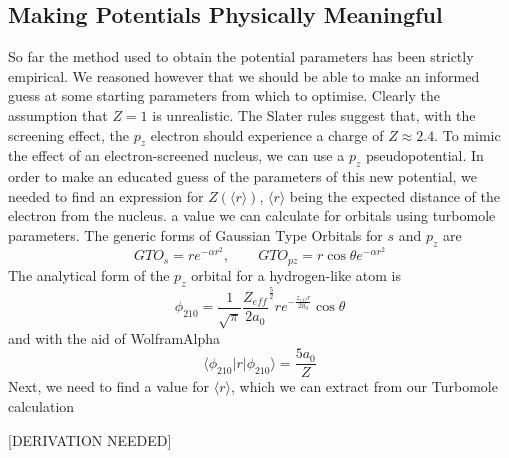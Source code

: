 \documentclass[journal=jctcce,manuscript=article]{achemso}
\begin{document}
\subsection{Making Potentials Physically Meaningful}

So far the method used to obtain the potential parameters has been strictly empirical. We reasoned however that we should be able to make an informed guess at some starting parameters from which to optimise. Clearly the assumption that \(Z = 1\) is unrealistic. The Slater rules suggest that, with the screening effect, the \(p_{z}\) electron should experience a charge of \(Z \approx 2.4\). To mimic the effect of an electron-screened nucleus, we can use a \(p_{z}\) pseudopotential. In order to make an educated guess of the parameters of this new potential, we needed to find an expression for \(Z(\langle r \rangle)\), \( \langle r \rangle \) being the expected distance of the electron from the nucleus. a value we can calculate for orbitals using turbomole parameters.
	The generic forms of Gaussian Type Orbitals for \(s\) and \(p_{z}\) are
\begin{equation}
GTO_{s} = re^{-\alpha r^{2}},\qquad	GTO_{pz} = r \cos \theta e^{-\alpha r^{2}}
\end{equation}
The analytical form of the \(p_{z}\) orbital for a hydrogen-like atom is
\begin{equation}
\phi_{210} = \frac{1}{\sqrt{\pi}} \frac{Z_{eff}}{2a_{0}} ^{\frac{5}{2}} re^{-\frac{z_{eff}r}{2a_{0}}} \cos \theta
\end{equation}
and with the aid of WolframAlpha
\begin{equation}
\langle \phi_{210} | r | \phi_{210} \rangle = \frac{5a_{0}}{Z}
\end{equation}
Next, we need to find a value for \( \langle r \rangle \), which we can extract from our Turbomole calculation

[DERIVATION NEEDED]
\end{document}
